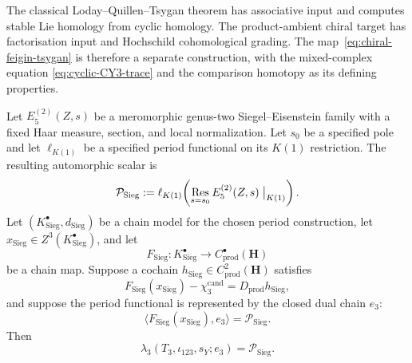 \begin{remark}
\label{rem:cft-chiral-vs-ordinary}
The classical Loday--Quillen--Tsygan theorem has associative input and
computes stable Lie homology from cyclic homology.  The product-ambient
chiral target has factorisation input and Hochschild cohomological
grading.  The map~\eqref{eq:chiral-feigin-tsygan} is therefore a
separate construction, with the mixed-complex equation
\eqref{eq:cyclic-CY3-trace} and the comparison homotopy as its defining
properties.
\end{remark}

\providecommand{\SpFour}{\mathrm{Sp}_4}
\providecommand{\Kone}{K(1)}
\providecommand{\HumbLat}{\mathrm{II}_{2,10}}
\providecommand{\EisCrit}{E_5^{(2)}}
\providecommand{\PeriodRes}{\mathrm{Res}}
\providecommand{\KS}{\mathrm{KS}}
\providecommand{\Bocherer}{\mathrm{B\ddot ocherer}}

\begin{theorem}
\label{thm:chi3-siegel-eisenstein-period}
\ClaimStatusConditional
Let \(E_5^{(2)}(Z,s)\) be a meromorphic genus-two Siegel--Eisenstein
family with a fixed Haar measure, section, and local normalization.
Let \(s_0\) be a specified pole and let
\(\ell_{K(1)}\) be a specified period functional on its \(K(1)\)
restriction.  The resulting automorphic scalar is
\begin{equation}
\label{eq:siegel-weil-residue}
 \mathcal P_{\mathrm{Sieg}}
 :=\ell_{K(1)}\!\left(
 \operatorname*{Res}_{s=s_0}E_5^{(2)}(Z,s)\bigm|_{K(1)}
 \right).
\end{equation}
Let \((K^\bullet_{\mathrm{Sieg}},d_{\mathrm{Sieg}})\) be a chain model
for the chosen period construction, let
\(x_{\mathrm{Sieg}}\in Z^3(K^\bullet_{\mathrm{Sieg}})\), and let
\[
 F_{\mathrm{Sieg}}\colon K^\bullet_{\mathrm{Sieg}}
 \longrightarrow C^\bullet_{\mathrm{prod}}(\mathbf H)
\]
be a chain map.  Suppose a cochain
\(h_{\mathrm{Sieg}}\in C^2_{\mathrm{prod}}(\mathbf H)\) satisfies
\begin{equation}
\label{eq:kohnen-period}
 F_{\mathrm{Sieg}}(x_{\mathrm{Sieg}})
 -\chi_3^{\mathrm{cand}}
 =D_{\mathrm{prod}}h_{\mathrm{Sieg}},
\end{equation}
and suppose the period functional is represented by the closed dual
chain \(e_3\):
\[
 \bigl\langle F_{\mathrm{Sieg}}(x_{\mathrm{Sieg}}),e_3\bigr\rangle
 =\mathcal P_{\mathrm{Sieg}}.
\]
Then
\begin{equation}
\label{eq:chi3-siegel-eisenstein-period}
 \lambda_3(T_3,\iota_{123},s_Y;e_3)
 =\mathcal P_{\mathrm{Sieg}}.
\end{equation}
\end{theorem}

